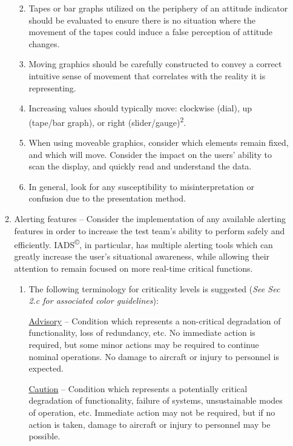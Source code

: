 \documentclass[
]{book}
\providecommand{\tightlist}{%
  \setlength{\itemsep}{0pt}\setlength{\parskip}{0pt}}
\begin{document}
\begin{enumerate}
\begin{enumerate}
    \begin{enumerate}
    \def\labelenumiii{\arabic{enumiii}.}
    \tightlist
    \item
      Tapes or bar graphs utilized on the periphery of an attitude indicator should be evaluated to ensure there is no situation where the movement of the tapes could induce a false perception of attitude changes.
    \item
      Moving graphics should be carefully constructed to convey a correct intuitive sense of movement that correlates with the reality it is representing.
    \item
      Increasing values should typically move: clockwise (dial), up (tape/bar graph), or right (slider/gauge)\textsuperscript{2}.
    \item
      When using moveable graphics, consider which elements remain fixed, and which will move. Consider the impact on the users' ability to scan the display, and quickly read and understand the data.
    \item
      In general, look for any susceptibility to misinterpretation or confusion due to the presentation method.
    \end{enumerate}
  \item
    Alerting features -- Consider the implementation of any available alerting features in order to increase the test team's ability to perform safely and efficiently. IADS\textsuperscript{©}, in particular, has multiple alerting tools which can greatly increase the user's situational awareness, while allowing their attention to remain focused on more real-time critical functions.

    \begin{enumerate}
    \def\labelenumiii{\arabic{enumiii}.}
    \item
      The following terminology for criticality levels is suggested (\emph{See Sec 2.c for associated color guidelines}):

      \underline{Advisory} -- Condition which represents a non-critical degradation of functionality, loss of redundancy, etc. No immediate action is required, but some minor actions may be required to continue nominal operations. No damage to aircraft or injury to personnel is expected.

      \underline{Caution} -- Condition which represents a potentially critical degradation of functionality, failure of systems, unsustainable modes of operation, etc. Immediate action may not be required, but if no action is taken, damage to aircraft or injury to personnel may be possible.


\end{enumerate}
\end{enumerate}
\end{enumerate}
\end{document}
